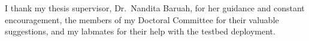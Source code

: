 I thank my thesis supervisor, Dr.\ Nandita Baruah, for her guidance and constant encouragement,
the members of my Doctoral Committee for their valuable suggestions, and my labmates for their
help with the testbed deployment.
